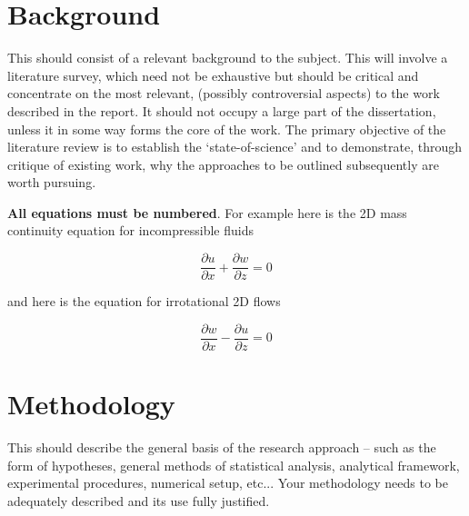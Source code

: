 \documentclass[a4paper,12pt]{article}
\begin{document}
\section{Background}
\label{sec:background}

This should consist of a relevant background to the subject. This will involve a literature survey, which need not be exhaustive but should be critical and concentrate on the most relevant, (possibly controversial aspects) to the work described in the report. It should not occupy a large part of the dissertation, unless it in some way forms the core of the work. The primary objective of the literature review is to establish the ‘state-of-science’ and to demonstrate, through critique of existing work, why the approaches to be outlined subsequently are worth pursuing.

\textbf{All equations must be numbered}. For example here is the 2D mass continuity equation for incompressible fluids


\begin{equation}
  \label{eq:mass-continuity}
  \frac{\partial u}{\partial x} + \frac{\partial w}{\partial z} = 0
\end{equation}

and here is the equation for irrotational 2D flows

\begin{equation}
  \label{eq:irrotationality}
  \frac{\partial w}{\partial x} - \frac{\partial u}{\partial z} = 0
\end{equation}


\clearpage


\section{Methodology}
\label{sec:methodology}


This should describe the general basis of the research approach – such as the form of hypotheses, general methods of statistical analysis, analytical framework, experimental procedures, numerical setup, etc... Your methodology needs to be adequately described and its use fully justified.


\clearpage


\end{document}
